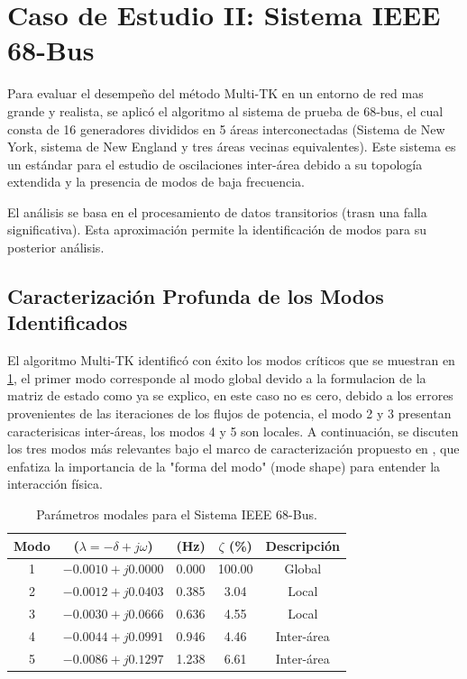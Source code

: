 \documentclass[conference]{IEEEtran}
\begin{document}
\section{Caso de Estudio II: Sistema IEEE 68-Bus}

Para evaluar el desempeño del método Multi-TK en un entorno de red mas grande y realista, se aplicó el algoritmo al sistema de prueba de 68-bus, el cual consta de 16 generadores divididos en 5 áreas interconectadas (Sistema de New York, sistema de New England y tres áreas vecinas equivalentes). Este sistema es un estándar para el estudio de oscilaciones inter-área debido a su topología extendida y la presencia de modos de baja frecuencia.

El análisis se basa en el procesamiento de datos transitorios (trasn una falla significativa). Esta aproximación permite la identificación de modos para su posterior análisis.


\subsection{Caracterización Profunda de los Modos Identificados}
El algoritmo Multi-TK identificó con éxito los modos críticos que se muestran en \ref{tab:resultados2}, el primer modo corresponde al modo global devido a la formulacion de la matriz de estado como ya se explico, en este caso no es cero, debido a los errores provenientes de las  iteraciones de los flujos de potencia, el modo 2 y 3 presentan caracterisicas inter-áreas, los modos 4 y 5 son locales. A continuación, se discuten los tres modos más relevantes bajo el marco de caracterización propuesto en \cite{ordonez}, que enfatiza la importancia de la "forma del modo" (mode shape) para entender la interacción física.

\begin{table}[htbp]
\caption{Parámetros modales para el Sistema IEEE 68-Bus.}
\label{tab:resultados2}
\centering
\begin{tabular}{c|c|c|c|c}
\toprule
Modo &  (\(\lambda = -\delta + j\omega\)) &  (Hz) &  \(\zeta\) (\%) & Descripción \\
\midrule
1 & \(-0.0010 + j0.0000\)  & 0.000 & 100.00 & Global \\
2 & \(-0.0012 + j0.0403\)  & 0.385 & 3.04  & Local \\
3 & \(-0.0030 + j0.0666\)  & 0.636 & 4.55  & Local\\
4 & \(-0.0044 + j0.0991\)  & 0.946 & 4.46  & Inter-área \\
5 & \(-0.0086 + j0.1297\)  & 1.238 & 6.61  & Inter-área \\
\bottomrule
\end{tabular}
\end{table}
\end{document}
